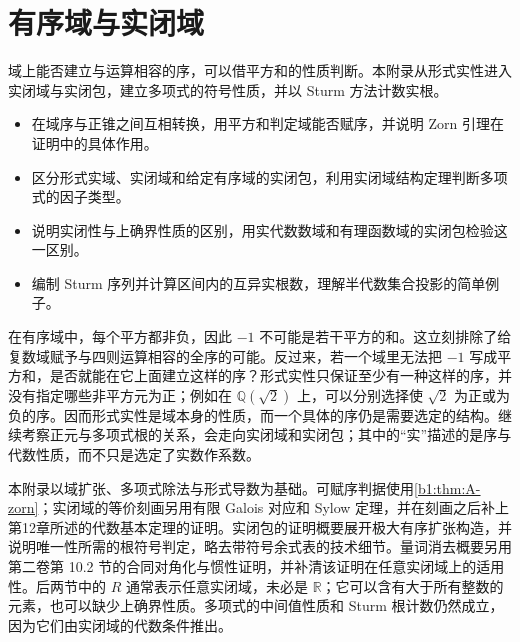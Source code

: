 
\chapter{有序域与实闭域}
\label{b1:app:E}

\begin{chapterabstract}
	域上能否建立与运算相容的序，可以借平方和的性质判断。本附录从形式实性进入实闭域与实闭包，建立多项式的符号性质，并以 Sturm 方法计数实根。
\end{chapterabstract}

\begin{learninggoals}
	\begin{itemize}
		\item 在域序与正锥之间互相转换，用平方和判定域能否赋序，并说明 Zorn 引理在证明中的具体作用。
		\item 区分形式实域、实闭域和给定有序域的实闭包，利用实闭域结构定理判断多项式的因子类型。
		\item 说明实闭性与上确界性质的区别，用实代数数域和有理函数域的实闭包检验这一区别。
		\item 编制 Sturm 序列并计算区间内的互异实根数，理解半代数集合投影的简单例子。
	\end{itemize}

\end{learninggoals}

在有序域中，每个平方都非负，因此 \(-1\) 不可能是若干平方的和。这立刻排除了给复数域赋予与四则运算相容的全序的可能。反过来，若一个域里无法把 \(-1\) 写成平方和，是否就能在它上面建立这样的序？形式实性只保证至少有一种这样的序，并没有指定哪些非平方元为正；例如在 \(\mathbb Q(\sqrt2)\) 上，可以分别选择使 \(\sqrt2\) 为正或为负的序。因而形式实性是域本身的性质，而一个具体的序仍是需要选定的结构。继续考察正元与多项式根的关系，会走向实闭域和实闭包；其中的“实”描述的是序与代数性质，而不只是选定了实数作系数。

\ProseParagraphBreak

本附录以域扩张、多项式除法与形式导数为基础。可赋序判据使用\cref{b1:thm:A-zorn}；实闭域的等价刻画另用有限 Galois 对应和 Sylow 定理，并在刻画之后补上第12章所述的代数基本定理的证明。实闭包的证明概要展开极大有序扩张构造，并说明唯一性所需的根符号判定，略去带符号余式表的技术细节。量词消去概要另用第二卷第 10.2 节的合同对角化与惯性证明，并补清该证明在任意实闭域上的适用性。后两节中的 \(R\) 通常表示任意实闭域，未必是 \(\mathbb R\)；它可以含有大于所有整数的元素，也可以缺少上确界性质。多项式的中间值性质和 Sturm 根计数仍然成立，因为它们由实闭域的代数条件推出。

